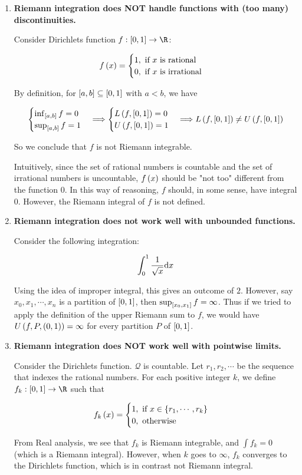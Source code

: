 \documentclass[
]{article}
\begin{document}
\begin{enumerate}
\def\labelenumi{\arabic{enumi}.}
\item
  \textbf{Riemann integration does NOT handle functions with (too many)
  discontinuities.}

  Consider Dirichlet\textquotesingle s function \(f:\br{0,1}\to \R\):

  \[f\left(x\right) = \begin{cases}
  1,\text{ if }x \text{ is rational}\\
  0,\text{ if }x \text{ is irrational}
  \end{cases}\]

  By definition, for \(\left[a,b\right]\subseteq \left[0,1\right]\) with \(a<b\), we
  have

  \[\begin{cases}
  \inf_{\left[a,b\right]}f = 0\\
  \sup_{\left[a,b\right]}f = 1
  \end{cases}\Longrightarrow \begin{cases}
  L\left(f,\left[0,1\right]\right) = 0\\
  U\left(f,\left[0,1\right]\right) = 1
  \end{cases}\Longrightarrow L\left(f,\left[0,1\right]\right)\ne U\left(f,\left[0,1\right]\right)\]

  So we conclude that \(f\) is not Riemann integrable.

  Intuitively, since the set of rational numbers is countable and the
  set of irrational numbers is uncountable, \(f\left(x\right)\) should be "not
  too" different from the function \(0\). In this way of reasoning,
  \(f\) should, in some sense, have integral \(0\). However, the Riemann
  integral of \(f\) is not defined.
\item
  \textbf{Riemann integration does not work well with unbounded
  functions.}

  Consider the following integration:

  \[\int_{0}^{1}\frac1{\sqrt x}\text d x\]

  Using the idea of improper integral, this gives an outcome of \(2\).
  However, say \(x_0,x_1,\cdots,x_n\) is a partition of \(\left[0,1\right]\),
  then \(\sup_{\left[x_0,x_1\right]}f = \infty\). Thus if we tried to apply the
  definition of the upper Riemann sum to \(f\), we would have
  \(U\left(f,P,\left(0,1\right)\right) = \infty\) for every partition \(P\) of
  \(\left[0,1\right]\).
\item
  \textbf{Riemann integration does NOT work well with pointwise limits.}

  Consider the Dirichlet\textquotesingle s function. \(\mathcal Q\) is
  countable. Let \(r_1,r_2,\cdots\) be the sequence that indexes the
  rational numbers. For each positive integer \(k\), we define
  \(f_k:\br{0,1}\to \R\) such that

  \[f_k\left(x\right) = \begin{cases}
   1, \text{ if } x\in \left\{r_1,\cdots,r_k\right\}\\
   0,\text{ otherwise}
  \end{cases}\]

  From Real analysis, we see that \(f_k\) is Riemann integrable, and
  \(\int f_k = 0\) (which is a Riemann integral). However, when \(k\)
  goes to \(\infty\), \(f_k\) converges to the
  Dirichlet\textquotesingle s function, which is in contrast not Riemann
  integral.
\end{enumerate}
\end{document}
